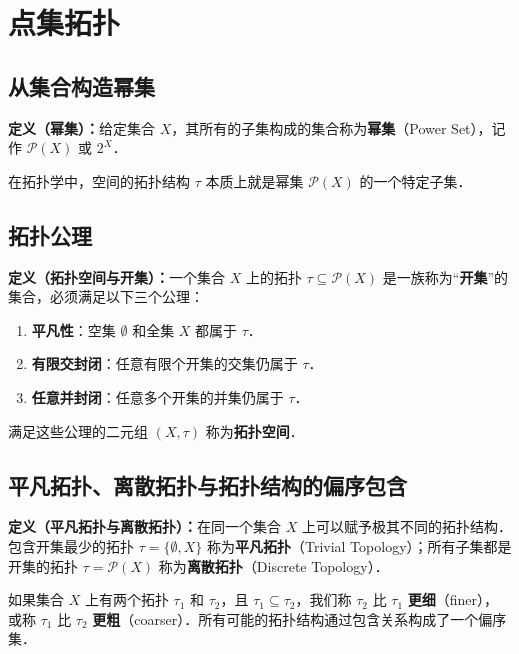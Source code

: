 \chapter{点集拓扑}

\section{从集合构造幂集}
\begin{framed}
\noindent\textbf{定义（幂集）：}给定集合 $X$，其所有的子集构成的集合称为\textbf{幂集}（Power Set），记作 $\mathcal{P}(X)$ 或 $2^X$．
\end{framed}
在拓扑学中，空间的拓扑结构 $\tau$ 本质上就是幂集 $\mathcal{P}(X)$ 的一个特定子集．

\section{拓扑公理}
\begin{framed}
\noindent\textbf{定义（拓扑空间与开集）：}一个集合 $X$ 上的拓扑 $\tau \subseteq \mathcal{P}(X)$ 是一族称为“\textbf{开集}”的集合，必须满足以下三个公理：
\begin{enumerate}
    \item \textbf{平凡性}：空集 $\emptyset$ 和全集 $X$ 都属于 $\tau$．
    \item \textbf{有限交封闭}：任意有限个开集的交集仍属于 $\tau$．
    \item \textbf{任意并封闭}：任意多个开集的并集仍属于 $\tau$．
\end{enumerate}
满足这些公理的二元组 $(X, \tau)$ 称为\textbf{拓扑空间}．
\end{framed}

\section{平凡拓扑、离散拓扑与拓扑结构的偏序包含}
\begin{framed}
\noindent\textbf{定义（平凡拓扑与离散拓扑）：}在同一个集合 $X$ 上可以赋予极其不同的拓扑结构．包含开集最少的拓扑 $\tau = \{\emptyset, X\}$ 称为\textbf{平凡拓扑}（Trivial Topology）；所有子集都是开集的拓扑 $\tau = \mathcal{P}(X)$ 称为\textbf{离散拓扑}（Discrete Topology）．
\end{framed}
如果集合 $X$ 上有两个拓扑 $\tau_1$ 和 $\tau_2$，且 $\tau_1 \subseteq \tau_2$，我们称 $\tau_2$ 比 $\tau_1$ \textbf{更细}（finer），或称 $\tau_1$ 比 $\tau_2$ \textbf{更粗}（coarser）．所有可能的拓扑结构通过包含关系构成了一个偏序集．


